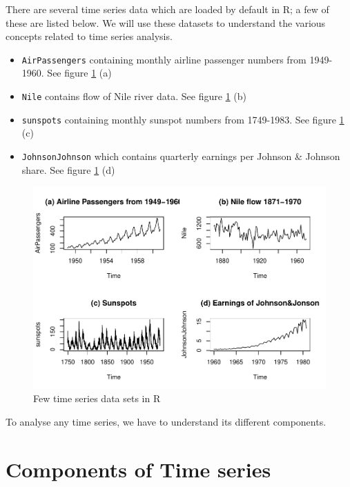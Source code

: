 \documentclass[
]{book}
\providecommand{\tightlist}{%
  \setlength{\itemsep}{0pt}\setlength{\parskip}{0pt}}
\begin{document}
There are several time series data which are loaded by default in R; a few of these are listed below. We will use these datasets to understand the various concepts related to time series analysis.

\begin{itemize}
\tightlist
\item
  \texttt{AirPassengers} containing monthly airline passenger numbers from 1949-1960. See figure \ref{fig:tsex} (a)
\item
  \texttt{Nile} contains flow of Nile river data. See figure \ref{fig:tsex} (b)
\item
  \texttt{sunspots} containing monthly sunspot numbers from 1749-1983. See figure \ref{fig:tsex} (c)
\item
  \texttt{JohnsonJohnson} which contains quarterly earnings per Johnson \& Johnson share. See figure \ref{fig:tsex} (d)
\end{itemize}

\begin{figure}

{\centering \includegraphics{DauR_files/figure-latex/tsex-1} 

}

\caption{Few time series data sets in R}\label{fig:tsex}
\end{figure}

To analyse any time series, we have to understand its different components.

\hypertarget{components-of-time-series}{%
\section{Components of Time series}\label{components-of-time-series}}
\end{document}
